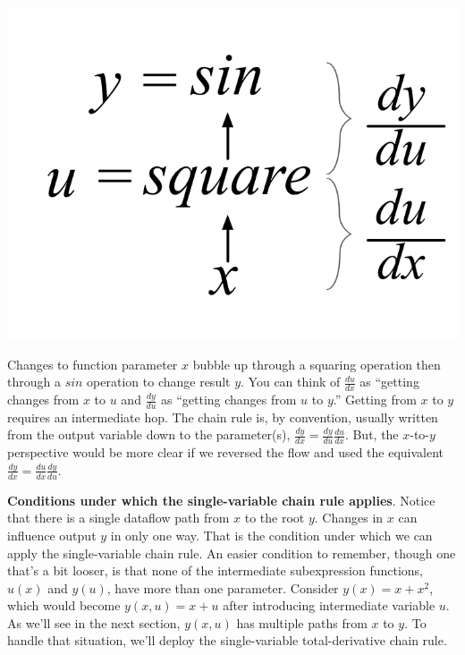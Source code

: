 \documentclass[11pt]{article}
\begin{document}
\includegraphics[scale=.9]{sin-square.png}

Changes to function parameter $x$ bubble up through a squaring operation then through a $sin$ operation to change result $y$. You can think of $\frac{du}{dx}$ as ``getting changes from $x$ to $u$ and $\frac{dy}{du}$ as ``getting changes from $u$ to $y$.'' Getting from $x$ to $y$ requires an intermediate hop. The chain rule is, by convention, usually written from the output variable down to the parameter(s), $\frac{dy}{dx} = \frac{dy}{du} \frac{du}{dx}$. But, the $x$-to-$y$ perspective would be more clear if we reversed the flow and used the equivalent $\frac{dy}{dx} = \frac{du}{dx}\frac{dy}{du}$.

{\bf Conditions under which the single-variable chain rule applies}. Notice that there is a single dataflow path from $x$ to the root $y$.  Changes in $x$ can influence output $y$ in only one way.  That is the condition under which we can apply the single-variable chain rule. An easier condition to remember, though one that's a bit looser, is that none of the intermediate subexpression functions, $u(x)$ and $y(u)$, have more than one parameter.  Consider $y(x) = x+x^2$, which would become $y(x,u) = x+u$ after introducing intermediate variable $u$.  As we'll see in the next section, $y(x,u)$ has multiple paths from $x$ to $y$. To handle that situation, we'll deploy the single-variable total-derivative chain rule.
	
\end{document}
